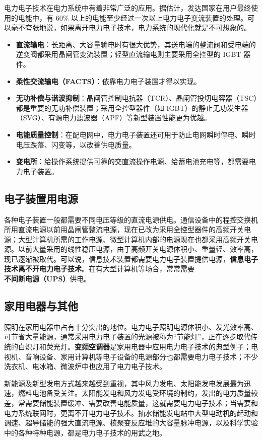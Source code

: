 电力电子技术在电力系统中有着非常广泛的应用。据估计，发达国家在用户最终使用的电能中，有 60\% 以上的电能至少经过一次以上电力电子变流装置的处理。可以毫不夸张地说，如果离开电力电子技术，电力系统的现代化就是不可想象的。

\begin{itemize}
  \item \textbf{直流输电}：长距离、大容量输电时有很大优势，其送电端的整流阀和受电端的逆变阀都采用晶闸管变流装置；轻型直流输电则主要采用全控型的 IGBT 器件。
  \item \textbf{柔性交流输电（FACTS）}：依靠电力电子装置才得以实现。
  \item \textbf{无功补偿与谐波抑制}：晶闸管控制电抗器（TCR）、晶闸管投切电容器（TSC）都是重要的无功补偿装置；采用全控型器件（如 IGBT）的静止无功发生器（SVG）、有源电力滤波器（APF）等新型装置性能更为优越。
  \item \textbf{电能质量控制}：在配电网中，电力电子装置还可用于防止电网瞬时停电、瞬时电压跌落、闪变等，以改善供电质量。
  \item \textbf{变电所}：给操作系统提供可靠的交直流操作电源、给蓄电池充电等，都需要电力电子装置。
\end{itemize}

\subsection{电子装置用电源}

各种电子装置一般都需要不同电压等级的直流电源供电。通信设备中的程控交换机所用直流电源以前用晶闸管整流电源，现在已改为采用全控型器件的高频开关电源；大型计算机所需的工作电源、微型计算机内部的电源现在也都采用高频开关电源。以前大量采用的线性稳压电源，由于高频开关电源体积小、重量轻、效率高，现已逐渐被取代。可以说，信息技术装置都需要电力电子装置提供电源，\textbf{信息电子技术离不开电力电子技术}。在有大型计算机等场合，常常需要\textbf{不间断电源（UPS）}供电。

\subsection{家用电器与其他}

照明在家用电器中占有十分突出的地位。电力电子照明电源体积小、发光效率高、可节省大量能源，通常采用电力电子装置的光源被称为“节能灯”，正在逐步取代传统的白炽灯和荧光灯。\textbf{变频空调器}是家用电器中应用电力电子技术的典型例子；电视机、音响设备、家用计算机等电子设备的电源部分也都需要电力电子技术；不少洗衣机、电冰箱、微波炉中也应用了电力电子技术。

新能源及新型发电方式越来越受到重视，其中风力发电、太阳能发电发展最为迅速，燃料电池备受关注。太阳能发电和风力发电受环境的制约，发出的电力质量较差，常需要储能装置缓冲、需要改善电能质量，这就需要电力电子技术；当需要和电力系统联网时，更离不开电力电子技术。抽水储能发电站中大型电动机的起动和调速、超导储能的强大直流电源、核聚变反应堆的大容量脉冲电源，以及科学实验中的各种特种电源，都是电力电子技术的用武之地。

